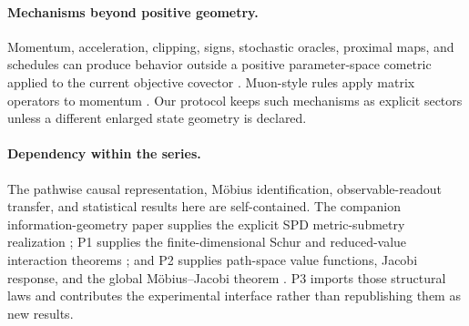 \paragraph{Mechanisms beyond positive geometry.}
Momentum, acceleration, clipping, signs, stochastic oracles, proximal maps, and schedules can produce behavior outside a positive parameter-space cometric applied to the current objective covector \citep{polyak1964some,nesterov1983method,su2016differential,wibisono2016variational,liu2023sophia,defazio2024road}.  Muon-style rules apply matrix operators to momentum \citep{jordan2024muon,essentialai2025muon,crawshaw2025muonvariants}.  Our protocol keeps such mechanisms as explicit sectors unless a different enlarged state geometry is declared.

\paragraph{Dependency within the series.}
The pathwise causal representation, M\"obius identification, observable-readout transfer, and statistical results here are self-contained.  The companion information-geometry paper supplies the explicit SPD metric-submetry realization \citep{li2026informationinducedgeometry}; P1 supplies the finite-dimensional Schur and reduced-value interaction theorems \citep{li2026optimizationgeometrodynamics}; and P2 supplies path-space value functions, Jacobi response, and the global M\"obius--Jacobi theorem \citep{li2026restrictedcomplexity}.  P3 imports those structural laws and contributes the experimental interface rather than republishing them as new results.
